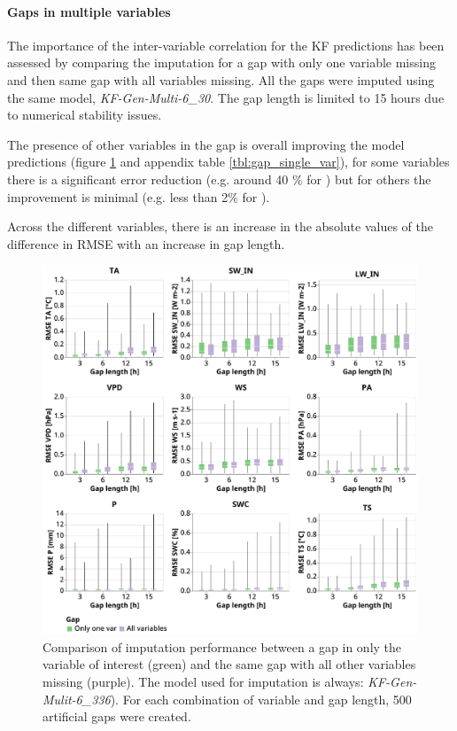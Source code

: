 \documentclass{article}
\newcommand{\imgwidth}{6in}
\begin{document}
\paragraph{Gaps in multiple variables} The importance of the inter-variable correlation for the KF predictions has been assessed by comparing the imputation for a gap with only one variable missing and then same gap with all variables missing. All the gaps were imputed using the same model, \textit{KF-Gen-Multi-6\_30}. The gap length is limited to 15 hours due to numerical stability issues.

The presence of other variables in the gap is overall improving the model predictions (figure \ref{fig:gap_single_var} and appendix table \ref{tbl:gap_single_var}), for some variables there is a significant error reduction (e.g. around 40 \% for ) but for others the improvement is minimal (e.g. less than 2\% for ).

Across the different variables, there is an increase in the absolute values of the difference in RMSE with an increase in gap length.

\begin{figure}
\centerline{\includegraphics[width=\imgwidth]{gap_single_var}}
\caption{Comparison of imputation performance between a gap in only the variable of interest (green) and the same gap with all other variables missing (purple). The model used for imputation is always: \textit{KF-Gen-Mulit-6\_336}). For each combination of variable and gap length, 500 artificial gaps were created.}
\label{fig:gap_single_var}
\end{figure}
\end{document}
